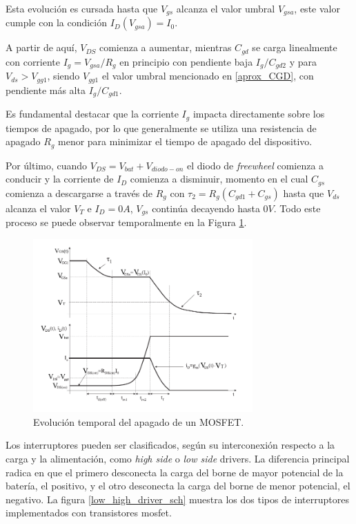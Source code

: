 \documentclass[10pt, a4paper]{article}
\begin{document}
Esta evolución es cursada hasta que $V_{gs}$ alcanza el valor umbral $V_{gsa}$,
este valor cumple con la condición $I_D(V_{gsa})=I_0$.

A partir de aquí, $V_{DS}$ comienza a aumentar, mientras $C_{gd}$ se carga
linealmente con corriente $I_g=V_{gsa}/R_g$ en principio con pendiente baja
$I_g/C_{gd2}$ y para $V_{ds} > V_{gg1}$, siendo $V_{gg1}$ el valor umbral
mencionado en \ref{aprox_CGD}, con pendiente más alta $I_g/C_{gd1}$.

Es fundamental destacar que la corriente $I_g$ impacta directamente sobre los
tiempos de apagado, por lo que generalmente se utiliza una resistencia de
apagado $R_g$ menor para minimizar el tiempo de apagado del dispositivo.

Por último, cuando $V_{DS} = V_{bat} + V_{diodo-on} $ el diodo de
\emph{freewheel} comienza a conducir y la corriente de $I_D$ comienza a
disminuir, momento en el cual $C_{gs}$ comienza a descargarse a través de $R_g$
con $\tau_2 = R_g (C_{gd1}+C_{gs})$ hasta que $V_{ds}$ alcanza el valor $V_T$ e
$I_D = 0A$, $V_{gs}$ continúa decayendo hasta $0V$. Todo este proceso se puede
observar temporalmente en la Figura \ref{apagado_time}.

\begin{figure}[h!]
	\begin{center}
		\includegraphics[width=0.75\textwidth]{shutdown_time.pdf}
		\caption{Evolución temporal del apagado de un MOSFET.}
		\label{apagado_time}
	\end{center}
\end{figure}
\FloatBarrier

Los interruptores pueden ser clasificados, según su interconexión respecto a la
carga y la alimentación, como \emph{high side} o \emph{low side} drivers. 
La diferencia principal radica en que el primero desconecta la
carga del borne de mayor potencial de la batería, el positivo, y el otro
desconecta la carga del borne de menor potencial, el negativo. La figura
\ref{low_high_driver_sch} muestra los dos tipos de interruptores implementados
con transistores mosfet.
\end{document}
